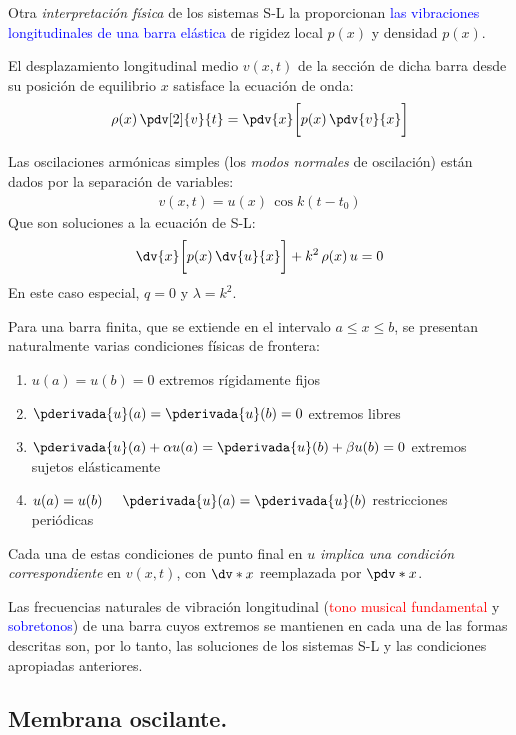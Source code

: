 Otra \emph{interpretación física} de los sistemas S-L la proporcionan \textcolor{blue}{las vibraciones longitudinales de una barra elástica} de rigidez local $p (x)$ y densidad $p (x)$.
\par
El desplazamiento longitudinal medio $v (x, t)$ de la sección de dicha barra desde su posición de equilibrio $x$ satisface la ecuación de onda:
\begin{align*}
\rho (x) \, \pdv[2]{v}{t} = \pdv{x} \bigg[ p (x) \, \pdv{v}{x} \bigg]
\end{align*}

Las oscilaciones armónicas simples (los \emph{modos normales} de oscilación) están dados por la separación de variables:
\begin{align*}
v (x, t) = u (x) \, \cos k(t - t_{0})
\end{align*}
Que son soluciones a la ecuación de S-L:
\begin{align*}
\dv{x} \bigg[ p (x) \, \dv{u}{x} \bigg] + k^{2} \, \rho (x) \, u = 0
\end{align*}
En este caso especial, $q = 0$ y $\lambda = k^{2}$.
\par
Para una barra finita, que se extiende en el intervalo $a \leq x \leq b$, se presentan naturalmente varias condiciones físicas de frontera:
\begin{enumerate}[label=\alph*)]
\item $u (a) = u (b) = 0$ extremos rígidamente fijos
\item $\pderivada{u} (a) = \pderivada{u} (b) = 0$ extremos libres
\item $\pderivada{u} (a) + \alpha u (a) = \pderivada{u} (b) + \beta u (b) = 0$ extremos sujetos elásticamente
\item $u (a) = u (b) \hspace{0.5cm} \pderivada{u} (a) = \pderivada{u} (b)$ restricciones periódicas
\end{enumerate}

Cada una de estas condiciones de punto final en $u$ \emph{implica una condición correspondiente} en $v (x, t)$, con $\dv*{x}$ reemplazada por $\pdv*{x}$.
\par
Las frecuencias naturales de vibración longitudinal (\textcolor{red}{tono musical fundamental} y \textcolor{blue}{sobretonos}) de una barra cuyos extremos se mantienen en cada una de las formas descritas son,  por lo tanto, las soluciones de los sistemas S-L y las condiciones apropiadas anteriores.

\subsection{Membrana oscilante.}

